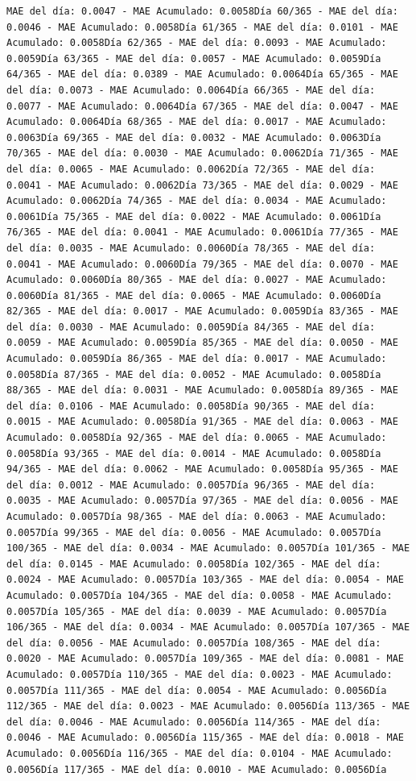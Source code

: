 \documentclass[
]{book}
\begin{document}
\begin{verbatim}
MAE del día: 0.0047 - MAE Acumulado: 0.0058Día 60/365 - MAE del día: 0.0046 - MAE Acumulado: 0.0058Día 61/365 - MAE del día: 0.0101 - MAE Acumulado: 0.0058Día 62/365 - MAE del día: 0.0093 - MAE Acumulado: 0.0059Día 63/365 - MAE del día: 0.0057 - MAE Acumulado: 0.0059Día 64/365 - MAE del día: 0.0389 - MAE Acumulado: 0.0064Día 65/365 - MAE del día: 0.0073 - MAE Acumulado: 0.0064Día 66/365 - MAE del día: 0.0077 - MAE Acumulado: 0.0064Día 67/365 - MAE del día: 0.0047 - MAE Acumulado: 0.0064Día 68/365 - MAE del día: 0.0017 - MAE Acumulado: 0.0063Día 69/365 - MAE del día: 0.0032 - MAE Acumulado: 0.0063Día 70/365 - MAE del día: 0.0030 - MAE Acumulado: 0.0062Día 71/365 - MAE del día: 0.0065 - MAE Acumulado: 0.0062Día 72/365 - MAE del día: 0.0041 - MAE Acumulado: 0.0062Día 73/365 - MAE del día: 0.0029 - MAE Acumulado: 0.0062Día 74/365 - MAE del día: 0.0034 - MAE Acumulado: 0.0061Día 75/365 - MAE del día: 0.0022 - MAE Acumulado: 0.0061Día 76/365 - MAE del día: 0.0041 - MAE Acumulado: 0.0061Día 77/365 - MAE del día: 0.0035 - MAE Acumulado: 0.0060Día 78/365 - MAE del día: 0.0041 - MAE Acumulado: 0.0060Día 79/365 - MAE del día: 0.0070 - MAE Acumulado: 0.0060Día 80/365 - MAE del día: 0.0027 - MAE Acumulado: 0.0060Día 81/365 - MAE del día: 0.0065 - MAE Acumulado: 0.0060Día 82/365 - MAE del día: 0.0017 - MAE Acumulado: 0.0059Día 83/365 - MAE del día: 0.0030 - MAE Acumulado: 0.0059Día 84/365 - MAE del día: 0.0059 - MAE Acumulado: 0.0059Día 85/365 - MAE del día: 0.0050 - MAE Acumulado: 0.0059Día 86/365 - MAE del día: 0.0017 - MAE Acumulado: 0.0058Día 87/365 - MAE del día: 0.0052 - MAE Acumulado: 0.0058Día 88/365 - MAE del día: 0.0031 - MAE Acumulado: 0.0058Día 89/365 - MAE del día: 0.0106 - MAE Acumulado: 0.0058Día 90/365 - MAE del día: 0.0015 - MAE Acumulado: 0.0058Día 91/365 - MAE del día: 0.0063 - MAE Acumulado: 0.0058Día 92/365 - MAE del día: 0.0065 - MAE Acumulado: 0.0058Día 93/365 - MAE del día: 0.0014 - MAE Acumulado: 0.0058Día 94/365 - MAE del día: 0.0062 - MAE Acumulado: 0.0058Día 95/365 - MAE del día: 0.0012 - MAE Acumulado: 0.0057Día 96/365 - MAE del día: 0.0035 - MAE Acumulado: 0.0057Día 97/365 - MAE del día: 0.0056 - MAE Acumulado: 0.0057Día 98/365 - MAE del día: 0.0063 - MAE Acumulado: 0.0057Día 99/365 - MAE del día: 0.0056 - MAE Acumulado: 0.0057Día 100/365 - MAE del día: 0.0034 - MAE Acumulado: 0.0057Día 101/365 - MAE del día: 0.0145 - MAE Acumulado: 0.0058Día 102/365 - MAE del día: 0.0024 - MAE Acumulado: 0.0057Día 103/365 - MAE del día: 0.0054 - MAE Acumulado: 0.0057Día 104/365 - MAE del día: 0.0058 - MAE Acumulado: 0.0057Día 105/365 - MAE del día: 0.0039 - MAE Acumulado: 0.0057Día 106/365 - MAE del día: 0.0034 - MAE Acumulado: 0.0057Día 107/365 - MAE del día: 0.0056 - MAE Acumulado: 0.0057Día 108/365 - MAE del día: 0.0020 - MAE Acumulado: 0.0057Día 109/365 - MAE del día: 0.0081 - MAE Acumulado: 0.0057Día 110/365 - MAE del día: 0.0023 - MAE Acumulado: 0.0057Día 111/365 - MAE del día: 0.0054 - MAE Acumulado: 0.0056Día 112/365 - MAE del día: 0.0023 - MAE Acumulado: 0.0056Día 113/365 - MAE del día: 0.0046 - MAE Acumulado: 0.0056Día 114/365 - MAE del día: 0.0046 - MAE Acumulado: 0.0056Día 115/365 - MAE del día: 0.0018 - MAE Acumulado: 0.0056Día 116/365 - MAE del día: 0.0104 - MAE Acumulado: 0.0056Día 117/365 - MAE del día: 0.0010 - MAE Acumulado: 0.0056Día 
\end{verbatim}
\end{document}
